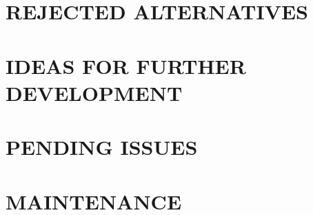 \documentclass[a4paper,twoside]{tce}
\begin{document}





\chapter{REJECTED ALTERNATIVES}





\chapter{IDEAS FOR FURTHER DEVELOPMENT}





\chapter{PENDING ISSUES}




\chapter{MAINTENANCE}
\end{document}
